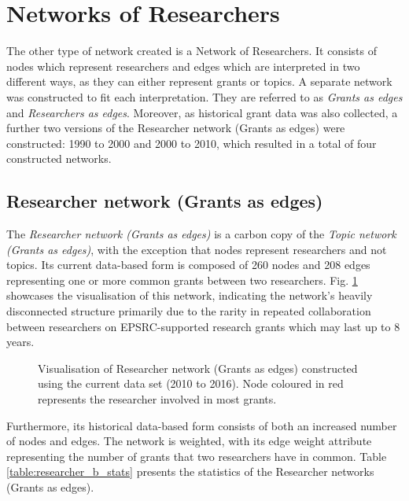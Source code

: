 {\section{Networks of Researchers}

The other type of network created is a Network of Researchers. It consists of nodes which represent researchers and edges which are interpreted in two different ways, as they can either represent grants or topics. A separate network was constructed to fit each interpretation. They are referred to as \textit{Grants as edges} and \textit{Researchers as edges}. Moreover, as historical grant data was also collected, a further two versions of the Researcher network (Grants as edges) were constructed: 1990 to 2000 and 2000 to 2010, which resulted in a total of four constructed networks.

\subsection{Researcher network (Grants as edges)}

The \textit{Researcher network (Grants as edges)} is a carbon copy of the \textit{Topic network (Grants as edges)}, with the exception that nodes represent researchers and not topics. Its current data-based form is composed of 260 nodes and 208 edges representing one or more common grants between two researchers. Fig. \ref{fig:researcher_b_vis} showcases the visualisation of this network, indicating the network's heavily disconnected structure primarily due to the rarity in repeated collaboration between researchers on EPSRC-supported research grants which may last up to 8 years.

\begin{figure}[htpb]
    \centering
    \caption{Visualisation of Researcher network (Grants as edges) constructed using the current data set (2010 to 2016). Node coloured in red represents the researcher involved in most grants.}
    \label{fig:researcher_b_vis}
\end{figure}

Furthermore, its historical data-based form consists of both an increased number of nodes and edges. The network is weighted, with its edge weight attribute representing the number of grants that two researchers have in common. Table \ref{table:researcher_b_stats} presents the statistics of the Researcher networks (Grants as edges).

}
